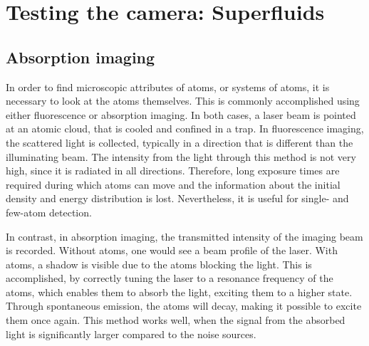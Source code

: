 \chapter{Testing the camera: Superfluids}
\iffalse
The purpose of the camera is to measure scientifically important data from dense atomic clouds consisting of Lithium and Caesium.
The improvement of the resolution in the whole imaging setup now allows to find new attributes that could not be measured before and as an example, fermionic superfluids were chosen. The key signature of a superfluid transition can be found by creating a population imbalance, that then shows a unique structure in the centre of the cloud, differing them from the Thomas-Fermi distribution that is apparent in Bose-Einstein condensates (BEC).
\fi

\section{Absorption imaging}
In order to find microscopic attributes of atoms, or systems of atoms, it is necessary to look at the atoms themselves. This is commonly accomplished using either fluorescence or absorption imaging. In both cases, a laser beam is pointed at an atomic cloud, that is cooled and confined in a trap. In fluorescence imaging, the scattered light is collected, typically in a direction that is different than the illuminating beam.
The intensity from the light through this method is not very high, since it is radiated in all directions. Therefore, long exposure times are required during which atoms can move and the information about the initial density and energy distribution is lost. Nevertheless, it is useful for single- and few-atom detection. 

In contrast, in absorption imaging, the transmitted intensity of the imaging beam is recorded. Without atoms, one would see a beam profile of the laser. With atoms, a shadow is visible due to the atoms blocking the light. This is accomplished, by correctly tuning the laser to a resonance frequency of the atoms, which enables them to absorb the light, exciting them to a higher state. Through spontaneous emission, the atoms will decay, making it possible to excite them once again. This method works well, when the signal from the absorbed light is significantly larger compared to the noise sources. 

